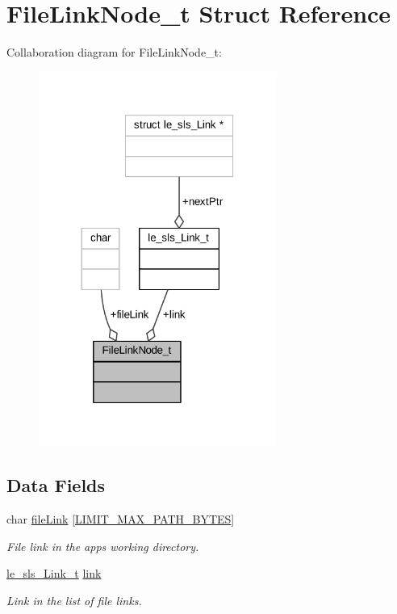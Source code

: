\hypertarget{struct_file_link_node__t}{}\section{File\+Link\+Node\+\_\+t Struct Reference}
\label{struct_file_link_node__t}


Collaboration diagram for File\+Link\+Node\+\_\+t\+:
\nopagebreak
\begin{figure}[H]
\begin{center}
\leavevmode
\includegraphics[width=221pt]{struct_file_link_node__t__coll__graph}
\end{center}
\end{figure}
\subsection*{Data Fields}
\begin{DoxyCompactItemize}
\item 
char \hyperlink{struct_file_link_node__t_ae0cb1cd03c2a85658fb6da5af566c077}{file\+Link} \mbox{[}\hyperlink{limit_8h_accd19a6264ef965c02f113dc01610e14}{L\+I\+M\+I\+T\+\_\+\+M\+A\+X\+\_\+\+P\+A\+T\+H\+\_\+\+B\+Y\+T\+ES}\mbox{]}
\begin{DoxyCompactList}\small\item\em File link in the app\textquotesingle{}s working directory. \end{DoxyCompactList}\item 
\hyperlink{structle__sls___link__t}{le\+\_\+sls\+\_\+\+Link\+\_\+t} \hyperlink{struct_file_link_node__t_ae78e8cda15fd5895330bc48b07bbf9fe}{link}
\begin{DoxyCompactList}\small\item\em Link in the list of file links. \end{DoxyCompactList}\end{DoxyCompactItemize}


